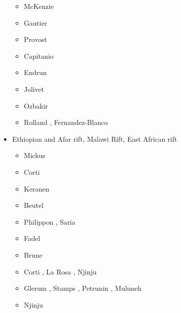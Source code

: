 \begin{itemize}
\begin{scriptsize}
\begin{itemize}
\item[\nineteenseventyeight] McKenzie \cite{mcke78b}
\item[\nineteenninetynine] Gautier \etal \cite{gabm99}
\item[\twothousandthree] Provost \etal \cite{prch03}
\item[\twothousandten] Capitanio \etal \cite{cazf10}
\item[\twothousandeleven] Endrun \etal \cite{enlm11}
\item[\twothousandthirteen] Jolivet \etal \cite{jofh13}
\item[\twothousandseventeen] Ozbakir \etal \cite{ozgw17}
\item[\twothousandtwenty] Rolland \etal \cite{rohb20}, Fernandez-Blanco \etal \cite{femb20}
\end{itemize}
\end{scriptsize}

\item{Ethiopian and Afar rift, Malawi Rift, East African rift} 

\begin{scriptsize}
\begin{itemize}
\item[\twothousandseven] Mickus \etal \cite{mitk07}
\item[\twothousandeight] Corti \cite{cort08}
\item[\twothousandnine] Keranen \etal \cite{kekj09}
\item[\twothousandten] Beutel \etal \cite{beve10}
\item[\twothousandfourteen] Philippon \etal \cite{phcs14}, Saria \etal \cite{sacs14}
\item[\twothousandfifteen] Fadel \etal \cite{favk15}
\item[\twothousandseventeen] Brune \etal \cite{brcr17} 
\item[\twothousandnineteen] Corti \etal \cite{cocf19}, La Rosa \etal \cite{lapk19}, Njinju \etal \cite{njas19}
\item[\twothousandtwenty] Glerum \etal \cite{glbs20}, Stamps \etal \cite{stkf20}, 
                          Petrunin \etal \cite{peke20}, Muluneh \etal \cite{mubi20}
\item[\twothousandtwentyone] Njinju \etal \cite{njsn21} 
\end{itemize}
\end{scriptsize}


\end{itemize}
